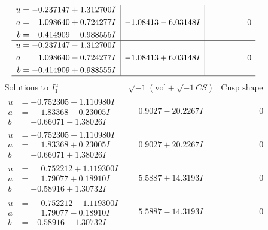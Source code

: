 \documentclass[1p]{elsarticle_modified}
\theoremstyle{definition}
\newcommand{\I}{\sqrt{-1}}
\begin{document}
$$\begin{array}{c|c|c}
\begin{aligned}
u &= -0.237147 + 1.312700 I \\
a &= \phantom{-}1.098640 + 0.724277 I \\
b &= -0.414909 - 0.988555 I\end{aligned}
 & -1.08413 - 6.03148 I & \phantom{-0.000000 } 0 \\ \hline\begin{aligned}
u &= -0.237147 - 1.312700 I \\
a &= \phantom{-}1.098640 - 0.724277 I \\
b &= -0.414909 + 0.988555 I\end{aligned}
 & -1.08413 + 6.03148 I & \phantom{-0.000000 } 0\\
 \hline 
 \end{array}$$\newpage$$\begin{array}{c|c|c}  
\text{Solutions to }I^u_{1}& \I (\text{vol} + \sqrt{-1}CS) & \text{Cusp shape}\\
 \hline 
\begin{aligned}
u &= -0.752305 + 1.110980 I \\
a &= \phantom{-}1.83368 - 0.23005 I \\
b &= -0.66071 - 1.38026 I\end{aligned}
 & \phantom{-}0.9027 - 20.2267 I & \phantom{-0.000000 } 0 \\ \hline\begin{aligned}
u &= -0.752305 - 1.110980 I \\
a &= \phantom{-}1.83368 + 0.23005 I \\
b &= -0.66071 + 1.38026 I\end{aligned}
 & \phantom{-}0.9027 + 20.2267 I & \phantom{-0.000000 } 0 \\ \hline\begin{aligned}
u &= \phantom{-}0.752212 + 1.119300 I \\
a &= \phantom{-}1.79077 + 0.18910 I \\
b &= -0.58916 + 1.30732 I\end{aligned}
 & \phantom{-}5.5887 + 14.3193 I & \phantom{-0.000000 } 0 \\ \hline\begin{aligned}
u &= \phantom{-}0.752212 - 1.119300 I \\
a &= \phantom{-}1.79077 - 0.18910 I \\
b &= -0.58916 - 1.30732 I\end{aligned}
 & \phantom{-}5.5887 - 14.3193 I & \phantom{-0.000000 } 0 \\ \hline\begin{aligned}

\end{aligned}
\end{array}$$
\end{document}
